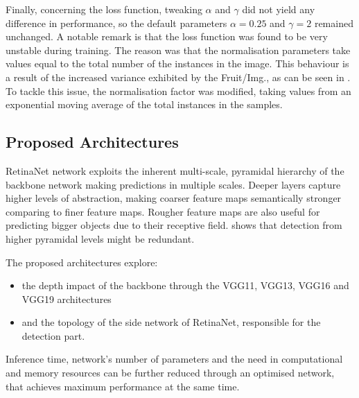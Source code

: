 Finally, concerning the loss function, tweaking $\alpha$ and $\gamma$ did not yield any difference in performance, so the default parameters $\alpha=0.25$ and $\gamma=2$ remained unchanged. A notable remark is that the loss function was found to be very unstable during training. The reason was that the normalisation parameters take values equal to the total number of the instances in the image. This behaviour is a result of the increased variance exhibited by the Fruit/Img., as can be seen in . To tackle this issue, the normalisation factor was modified, taking values from an exponential moving average of the total instances in the samples.
 
\subsection{Proposed Architectures}
RetinaNet network exploits the inherent multi-scale, pyramidal hierarchy of the backbone network making predictions in multiple scales. Deeper layers capture higher levels of abstraction, making coarser feature maps semantically stronger comparing to finer feature maps. Rougher feature maps are also useful for predicting bigger objects due to their receptive field.  shows that detection from higher pyramidal levels might be redundant. 

The proposed architectures explore:
\begin{itemize}
 \item the depth impact of the backbone through the VGG11, VGG13, VGG16 and VGG19 architectures
 \item and the topology of the side network of RetinaNet, responsible for the detection part.
\end{itemize}

Inference time, network's number of parameters and the need in computational and memory resources can be further reduced through an optimised network, that achieves maximum performance at the same time.

